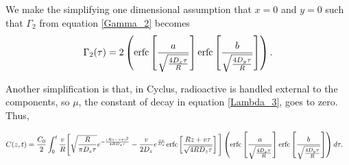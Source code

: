 We make the simplifying one dimensional assumption that $x=0$ and $y=0$ such 
that $\Gamma_2$ from equation \eqref{Gamma_2} becomes
\begin{align}
  \Gamma_2(\tau) = 2\left(\mathrm{erfc}\left[{\frac{a}{\sqrt{\frac{4D_x\tau}{R}}} }\right]
  \mathrm{erfc}\left[{\frac{b}{\sqrt{\frac{4D_y\tau}{R}}}}\right]\right).
\end{align}

Another simplification is that, in Cyclus, radioactive is handled external to 
the components, so $\mu$, the constant of decay in equation \eqref{Lambda_3},
goes to zero. Thus,

\begin{align}
  C(z,t)&= \frac{C_0}{2}\int_0^t\frac{v}{R}
  \Bigg[\sqrt{\frac{R}{\pi D_z\tau}}e^{-\frac{(Rz-v\tau)^2}{4RD_z\tau}} - 
    \frac{v}{2D_z}e^\frac{vz}{D_z}\mathrm{erfc}\left[{\frac{Rz+v\tau}{\sqrt{4RD_z\tau}}}\right]\Bigg]
  \left(\mathrm{erfc}\left[{\frac{a}{\sqrt{\frac{4D_x\tau}{R}}} }\right]
  \mathrm{erfc}\left[{\frac{b}{\sqrt{\frac{4D_y\tau}{R}}}}\right]\right)
  d\tau .
  \label{simple_leij}
\end{align}


